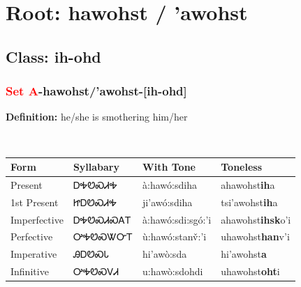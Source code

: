 \needspace{4in}
\section*{Root: hawohst / 'awohst}
\nopagebreak
{}
\needspace{3in}
\subsection*{Class: ih-ohd}
\nopagebreak
\needspace{2in}
\subsubsection*{\textcolor{Red}{Set A}{-}\textbf{hawohst/'awohst}{-}[ih-ohd]}
\nopagebreak
\textbf{Definition: } he/she is smothering him/her
\\[0.5em]
\begin{tabularx}{\textwidth}{l X X X}%
\toprule%
\textbf{Form}&\textbf{Syllabary}&\textbf{With Tone}&\textbf{Toneless}\\%
\midrule%
Present&ᎠᎭᏬᏍᏗᎭ&à:hawó:sdiha&ahawohst\textbf{ih}a\\%
1st Present&ᏥᎠᏬᏍᏗᎭ&ji’awó:sdiha&tsi'awohst\textbf{ih}a\\%
Imperfective&ᎠᎭᏬᏍᏗᏍᎪᎢ&à:hawó:sdi:sgó:’i&ahawohst\textbf{ihsk}o'i\\%
Perfective&ᎤᎭᏬᏍᏔᏅᎢ&ù:hawó:stanv̌:’i&uhawohst\textbf{han}v'i\\%
Imperative&ᎯᎠᏬᏍᏓ&hi’awò:sda&hi'awohst\textbf{a}\\%
Infinitive&ᎤᎭᏬᏍᏙᏗ&u:hawò:sdohdi&uhawohst\textbf{oht}i\\%
\bottomrule%
\end{tabularx}
\\[1em]
\needspace{2in}
